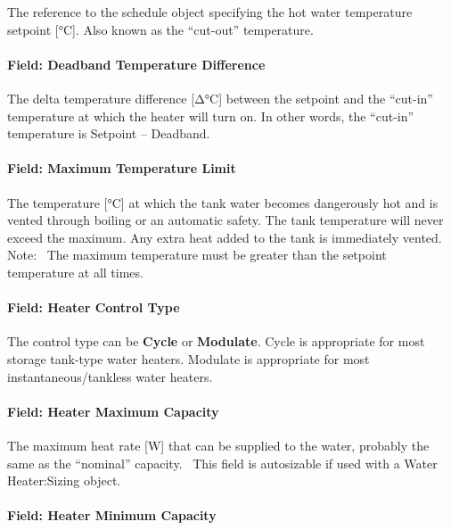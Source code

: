 The reference to the schedule object specifying the hot water temperature setpoint {[}°C{]}. Also known as the ``cut-out'' temperature.

\paragraph{Field: Deadband Temperature Difference}\label{field-deadband-temperature-difference-000}

The delta temperature difference {[}Δ°C{]} between the setpoint and the ``cut-in'' temperature at which the heater will turn on. In other words, the ``cut-in'' temperature is Setpoint -- Deadband.

\paragraph{Field: Maximum Temperature Limit}\label{field-maximum-temperature-limit}

The temperature {[}°C{]} at which the tank water becomes dangerously hot and is vented through boiling or an automatic safety. The tank temperature will never exceed the maximum. Any extra heat added to the tank is immediately vented. Note:~ The maximum temperature must be greater than the setpoint temperature at all times.

\paragraph{Field: Heater Control Type}\label{field-heater-control-type}

The control type can be \textbf{Cycle} or \textbf{Modulate}. Cycle is appropriate for most storage tank-type water heaters. Modulate is appropriate for most instantaneous/tankless water heaters.

\paragraph{Field: Heater Maximum Capacity}\label{field-heater-maximum-capacity}

The maximum heat rate {[}W{]} that can be supplied to the water, probably the same as the ``nominal'' capacity.~ This field is autosizable if used with a Water Heater:Sizing object.

\paragraph{Field: Heater Minimum Capacity}\label{field-heater-minimum-capacity}

